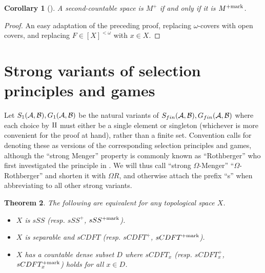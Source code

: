 \documentclass{amsart}
\theoremstyle{plain}
\newtheorem{theorem}{Theorem}
\newtheorem{corollary}[theorem]{Corollary}
\theoremstyle{definition}
\theoremstyle{remark}
\theoremstyle{plain}
\theoremstyle{definition}
\theoremstyle{remark}
\begin{document}
\begin{corollary}[\cite{clontzMengerCMUC}]
  A second-countable space is \(M^+\) if and only if
  it is \(M^{+\mathrm{mark}}\).
\end{corollary}

\begin{proof}
  An easy adaptation of the preceding proof, replacing \(\omega\)-covers
  with open covers, and replacing \(F\in[X]^{<\omega}\) with \(x\in X\).
\end{proof}

\section{Strong variants of selection principles and games}

Let \(S_{1}(\mathcal{A},\mathcal{B}),G_{1}(\mathcal{A},\mathcal{B})\)
be the natural variants of
\(S_{fin}(\mathcal{A},\mathcal{B}),G_{fin}(\mathcal{A},\mathcal{B})\) where each choice
by \(\mathrm{II}\) must either be a single element or singleton
(whichever is more convenient for the proof at hand), rather than a finite
set. Convention calls for denoting these as
 versions of the corresponding selection principles and games,
although the ``strong Menger'' property is commonly known as ``Rothberger''
who first investigated the principle in \cite{Rothberger1938}. We will thus
call ``strong \(\Omega\)-Menger'' ``\(\Omega\)-Rothberger'' and shorten it
with \(\Omega R\), and otherwise attach the prefix ``s''
when abbreviating to all other strong variants.

\begin{theorem}
  The following are equivalent for any topological space \(X\).
  \begin{itemize}
    \item \(X\) is \(sSS\) (resp. \(sSS^+\), \(sSS^{+\mathrm{mark}}\)).
    \item \(X\) is separable and \(sCDFT\)
          (resp. \(sCDFT^+\), \(sCDFT^{+\mathrm{mark}}\)).
    \item \(X\) has a countable dense subset \(D\) where
          \(sCDFT_x\) (resp. \(sCDFT_x^+\), \(sCDFT_x^{+\mathrm{mark}}\))
          holds for all \(x\in D\).
  \end{itemize}
\end{theorem}
\end{document}

